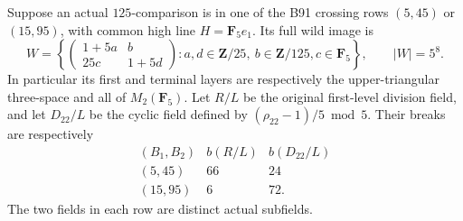 \begin{lemma}
\label{lem:B-RD92-parahoric}
Suppose an actual \(125\)-comparison is in one of the B91
crossing rows \((5,45)\) or \((15,95)\), with common high line
\(H=\mathbf F_5e_1\). Its full wild image is
\[
 W=\left\{
 \begin{pmatrix}1+5a&b\\25c&1+5d\end{pmatrix}:
 a,d\in\mathbf Z/25,\ b\in\mathbf Z/125,
 c\in\mathbf F_5\right\},\qquad |W|=5^8.            \tag{B-RD92.6}
\]
In particular its first and terminal layers are respectively
the upper-triangular three-space and all of \(M_2(\mathbf F_5)\).
Let \(R/L\) be the original first-level division field, and let
\(D_{22}/L\) be the cyclic field defined by
\((\rho_{22}-1)/5\bmod5\). Their breaks are respectively
\[
 \begin{array}{c|cc}
 (B_1,B_2)&b(R/L)&b(D_{22}/L)\\\hline
 (5,45)&66&24\\
 (15,95)&6&72.
 \end{array}                                           \tag{B-RD92.7}
\]
The two fields in each row are distinct actual subfields.
\end{lemma}
